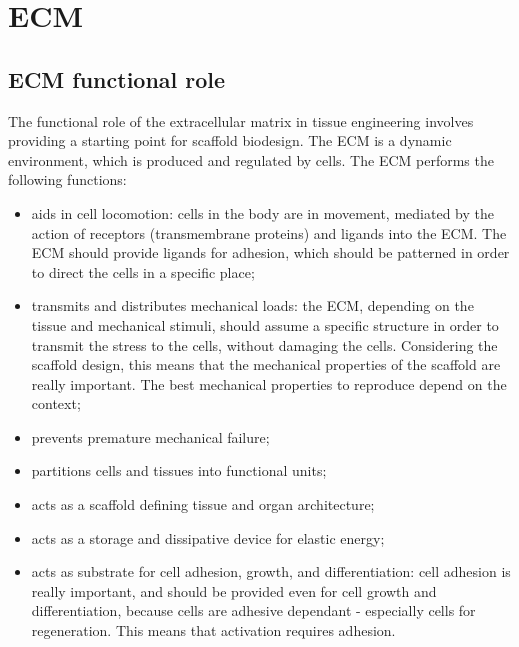 \graphicspath{{chapters/ecm/}}
\chapter{ECM}

\section{ECM functional role}
The functional role of the extracellular matrix in tissue engineering involves providing a starting point for scaffold biodesign.
The ECM is a dynamic environment, which is produced and regulated by cells.
The ECM performs the following functions:

\begin{multicols}{2}
	\begin{itemize}
		\item aids in cell locomotion: cells in the body are in movement, mediated by the action of receptors (transmembrane proteins) and ligands into the ECM. The ECM should provide ligands for adhesion, which should be patterned in order to direct the cells in a specific place;
		\item transmits and distributes mechanical loads: the ECM, depending on the tissue and mechanical stimuli, should assume a specific structure in order to transmit the stress to the cells, without damaging the cells. Considering the scaffold design, this means that the mechanical properties of the scaffold are really important. The best mechanical properties to reproduce depend on the context;
		\item prevents premature mechanical failure;
		\item partitions cells and tissues into functional units;
		\item acts as a scaffold defining tissue and organ architecture;
		\item acts as a storage and dissipative device for elastic energy;
		\item acts as substrate for cell adhesion, growth, and differentiation: cell adhesion is really important, and should be provided even for cell growth and differentiation, because cells are adhesive dependant - especially cells for regeneration. This means that activation requires adhesion.
	\end{itemize}
\end{multicols}

